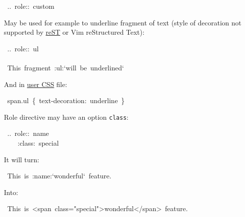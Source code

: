 \documentclass[12pt]{article}
\begin{document}
\begin{ttfamily}\begin{flushleft}
\mbox{~..~role::~custom}\\
\end{flushleft}\end{ttfamily}

May be used for example to underline fragment of text (style of decoration not
supported by \href{http://docutils.sf.net}{reST} or Vim reStructured Text):

\begin{ttfamily}\begin{flushleft}
\mbox{~..~role::~ul}\\
\mbox{}\\
\mbox{~This~fragment~:ul:`will~be~underlined`}\\
\end{flushleft}\end{ttfamily}

And in \href{\#luser-css}{user CSS} file:

\begin{ttfamily}\begin{flushleft}
\mbox{~span.ul~\{~text-decoration:~underline~\}}\\
\end{flushleft}\end{ttfamily}

Role directive may have an option \texttt{class}:

\begin{ttfamily}\begin{flushleft}
\mbox{~..~role::~name}\\
\mbox{~~~~:class:~special}\\
\end{flushleft}\end{ttfamily}

It will turn:

\begin{ttfamily}\begin{flushleft}
\mbox{~This~is~:name:`wonderful`~feature.}\\
\end{flushleft}\end{ttfamily}

Into:

\begin{ttfamily}\begin{flushleft}
\mbox{~This~is~<span~class="special">wonderful</span>~feature.}\\
\end{flushleft}\end{ttfamily}
\end{document}
